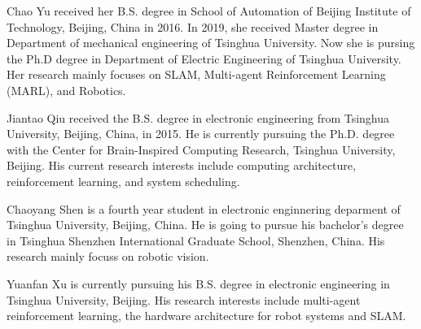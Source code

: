\documentclass[journal]{IEEEtran}
\begin{document}
\begin{IEEEbiography}{Chao Yu}
  \footnotesize
  received her B.S. degree in School of Automation of Beijing Institute of Technology, Beijing, China in 2016. In 2019, she received Master degree in Department of mechanical engineering of Tsinghua University. Now she is pursing the Ph.D degree in Department of Electric Engineering of Tsinghua University. Her research mainly focuses on SLAM, Multi-agent Reinforcement Learning (MARL), and Robotics.
\end{IEEEbiography}

\begin{IEEEbiography}{Jiantao Qiu}
  \footnotesize
  received the B.S. degree in electronic engineering from Tsinghua University, Beijing, China, in 2015. He is currently pursuing the Ph.D. degree with the Center for Brain-Inspired Computing Research, Tsinghua University, Beijing. His current research interests include computing architecture, reinforcement learning, and system scheduling.
\end{IEEEbiography}


\begin{IEEEbiography}{Chaoyang Shen}
  \footnotesize
  is a fourth year student in electronic enginnering deparment of Tsinghua University, Beijing, China. He is going to pursue his bachelor's degree in Tsinghua Shenzhen International Graduate School, Shenzhen, China. His research mainly focuss on  robotic vision.
\end{IEEEbiography}

\begin{IEEEbiography}{Yuanfan Xu}
  \footnotesize
  is currently pursuing his B.S. degree in electronic engineering in Tsinghua University, Beijing. His research interests include multi-agent reinforcement learning,  the hardware architecture for robot systems and SLAM.
\end{IEEEbiography}
\end{document}
